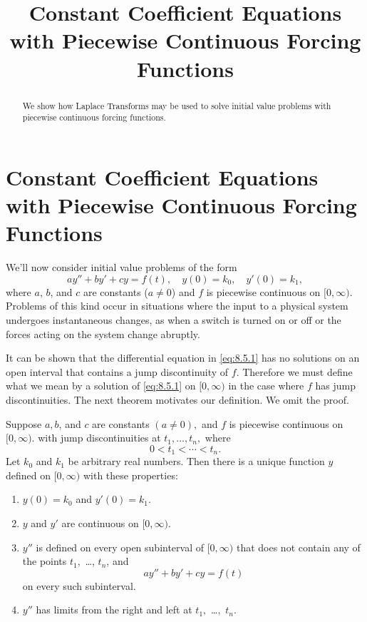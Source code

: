 \documentclass{ximera}
\title{Constant Coefficient Equations with Piecewise Continuous Forcing Functions}%
\begin{document}
\begin{abstract}
We show how Laplace Transforms may be used to solve initial value problems with piecewise continuous forcing functions.
\end{abstract}

\maketitle

\section*{Constant Coefficient Equations with Piecewise Continuous Forcing Functions}

We'll now consider initial value problems of the form
\begin{equation}\label{eq:8.5.1}
 ay''+by'+cy=f(t), \quad  y(0)=k_0,\quad y'(0)=k_1,
\end{equation}
where $a$, $b$, and $c$ are constants ($a\neq 0$) and $f$ is piecewise
continuous on $[0,\infty)$. Problems of this kind occur in situations
where the input to a physical system undergoes instantaneous changes,
as when a switch is turned on or off or the forces acting on the
system change abruptly.

It can be shown %
that the differential equation in \eqref{eq:8.5.1} has no solutions on
an open interval that contains a jump discontinuity of $f$. Therefore we
must define what we mean by a solution of \eqref{eq:8.5.1} on $[0,\infty)$
in the case where $f$ has jump discontinuities. The next theorem
motivates our definition. We omit the proof.

\begin{theorem}\label{thmtype:8.5.1}
Suppose $a,b$, and $c$ are constants $(a\neq 0),$ and $f$ is
piecewise  continuous on $[0,\infty).$ with jump discontinuities
at $t_1, \dots, t_n,$ where
$$
0<t_1<\cdots<t_n.
$$
 Let $k_0$ and $k_1$ be arbitrary real numbers. Then there
is a unique function $y$ defined on $[0,\infty)$ with these
properties:
\begin{enumerate}
\item %
 $y(0)=k_0$ and  $y'(0)=k_1$.
\item %
 $y$ and $y'$  are continuous on $[0,\infty)$.
\item %
$y''$ is defined
on every open subinterval of $[0,\infty)$ that does not contain any of the
points $t_1,$ \dots, $t_n$, and
$$
ay''+by'+cy=f(t)
$$
on every such subinterval.
\item %
$y''$ has limits from the right and left at $t_1,$ \dots$,$ $t_n$.
\end{enumerate}
\end{theorem}
\end{document}

